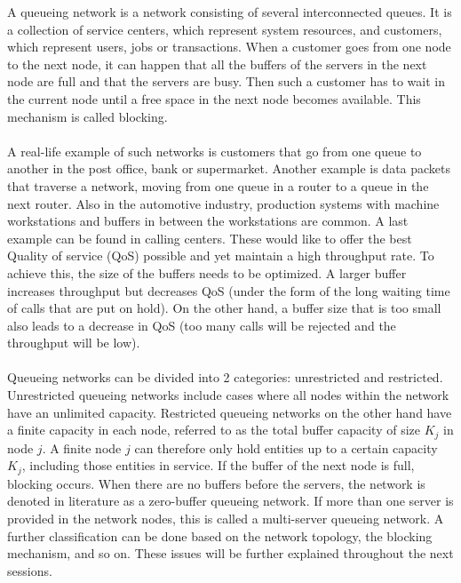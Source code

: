 \documentclass[twoside]{article}
\begin{document}
\begin{multicols}{2}
A queueing network is a network consisting of several interconnected queues.
It is a collection of service centers, which represent system resources, and customers, which represent users, jobs or transactions. When a customer goes from one node to the next node, it can happen that all the buffers of the servers in the next node are full and that the servers are busy. Then such a customer has to wait in the current node until a free space in the next node becomes available. This mechanism is called blocking.\\\\
A real-life example of such networks is customers that go from one queue to another in the post office, bank or supermarket. Another example is data packets that traverse a network, moving from one queue in a router to a queue in the next router. Also in the automotive industry, production systems with machine workstations and buffers in between the workstations are common. A last example can be found in calling centers. These would like to offer the best Quality of service (QoS) possible and yet maintain a high throughput rate. To achieve this, the size of the buffers needs to be optimized. A larger buffer increases throughput but decreases QoS (under the form of the long waiting time of calls that are put on hold). On the other hand, a buffer size that is too small also leads to a decrease in QoS (too many calls will be rejected and the throughput will be low).
\\\\
Queueing networks can be divided into 2 categories: unrestricted and restricted. Unrestricted queueing networks include cases where all nodes within the network have an unlimited capacity. 
Restricted queueing networks on the other hand have a finite capacity in each node, referred to as the total buffer capacity of size $K_j$ in node $j$. A finite node $j$ can therefore only hold entities up to a certain capacity $K_j$, including those entities in service. If the buffer of the next node is full, blocking occurs. When there are no buffers before the servers, the network is denoted in literature as a zero-buffer queueing network. If more than one server is provided in the network nodes, this is called a multi-server queueing network. A further classification can be done based on the network topology, the blocking mechanism, and so on. These issues will be further explained throughout the next sessions.

\end{multicols}
\end{document}
